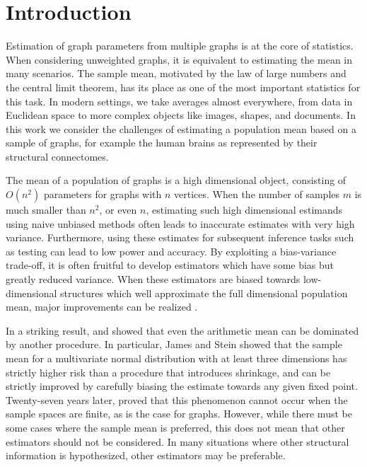 
\chapter{Introduction}
\label{chap:intro}

Estimation of graph parameters from multiple graphs is at the core of statistics.
When considering unweighted graphs, it is equivalent to estimating the mean in many scenarios.
The sample mean, motivated by the law of large numbers and the central limit theorem, has its place as one of the most important statistics for this task.
In modern settings, we take averages almost everywhere, from data in Euclidean space to more complex objects like images, shapes, and documents.
In this work we consider the challenges of estimating a population mean based on a sample of graphs, for example the human brains as represented by their structural connectomes. 

The mean of a population of graphs is a high dimensional object, consisting of $O(n^2)$ parameters for graphs with $n$ vertices.
When the number of samples $m$ is much smaller than $n^2$, or even $n$, estimating such high dimensional estimands using naive unbiased methods often leads to inaccurate estimates with very high variance.
Furthermore, using these estimates for subsequent inference tasks such as testing can lead to low power and accuracy.
By exploiting a bias-variance trade-off, it is often fruitful to develop estimators which have some bias but greatly reduced variance.
When these estimators are biased towards low-dimensional structures which well approximate the full dimensional population mean, major improvements can be realized \citep{trunk1979problem}.

In a striking result, \citet{stein1956inadmissibility} and \citet{james1961estimation} showed that even the arithmetic mean can be dominated by another procedure.
In particular, James and Stein showed that the sample mean for a multivariate normal distribution with at least three dimensions has strictly higher risk than a procedure that introduces shrinkage, and can be strictly improved by carefully biasing the  estimate towards any given fixed point. 
Twenty-seven years later, \citet{gutmann1982stein} proved that this phenomenon cannot occur when the sample spaces are finite, as is the case for graphs.
However, while there must be some cases where the sample mean is preferred, this does not mean that other estimators should not be considered.
In many situations where other structural information is hypothesized, other estimators may be preferable.

